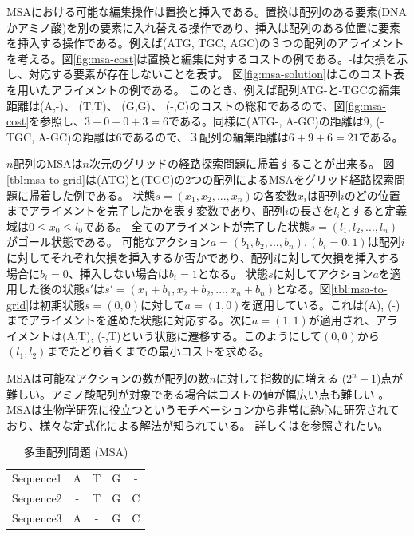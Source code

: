 MSAにおける可能な編集操作は置換と挿入である。置換は配列のある要素(DNAかアミノ酸)を別の要素に入れ替える操作であり、挿入は配列のある位置に要素を挿入する操作である。例えば(ATG, TGC, AGC)の３つの配列のアライメントを考える。図\ref{fig:msa-cost}は置換と編集に対するコストの例である。-は欠損を示し、対応する要素が存在しないことを表す。%
図\ref{fig:msa-solution}はこのコスト表を用いたアライメントの例である。
このとき、例えば配列ATG-と-TGCの編集距離は(A,-)、 (T,T)、 (G,G)、 (-,C)のコストの総和であるので、図\ref{fig:msa-cost}を参照し、$3+0+0+3=6$である。同様に(ATG-, A-GC)の距離は$9$, (-TGC, A-GC)の距離は$6$であるので、３配列の編集距離は$6+9+6=21$である。

$n$配列のMSAは$n$次元のグリッドの経路探索問題に帰着することが出来る\cite{korf:2000}。
図\ref{tbl:msa-to-grid}は(ATG)と(TGC)の2つの配列によるMSAをグリッド経路探索問題に帰着した例である。
状態$s = (x_1, x_2,...,x_n)$の各変数$x_i$は配列$i$のどの位置までアライメントを完了したかを表す変数であり、配列$i$の長さを$l_i$とすると定義域は$0 \leq x_0 \leq l_0$である。
全てのアライメントが完了した状態$s=(l_1, l_2,...,l_n)$がゴール状態である。
可能なアクション$a=(b_1, b_2, ..., b_n), (b_i=0, 1)$は配列$i$に対してそれぞれ欠損を挿入するか否かであり、配列$i$に対して欠損を挿入する場合に$b_i=0$、挿入しない場合は$b_i=1$となる。
状態$s$に対してアクション$a$を適用した後の状態$s'$は$s'=(x_1+b_1, x_2+b_2,..., x_n+b_n)$となる。図\ref{tbl:msa-to-grid}は初期状態$s=(0,0)$に対して$a=(1,0)$を適用している。これは(A), (-)までアライメントを進めた状態に対応する。次に$a=(1,1)$が適用され、アライメントは(A,T), (-,T)という状態に遷移する。このようにして$(0, 0)$から$(l_1, l_2)$までたどり着くまでの最小コストを求める。

MSAは可能なアクションの数が配列の数$n$に対して指数的に増える ($2^n-1$)点が難しい。アミノ酸配列が対象である場合はコストの値が幅広い点も難しい \cite{pearson1990}。
MSAは生物学研究に役立つというモチベーションから非常に熱心に研究されており、様々な定式化による解法が知られている。
詳しくは\cite{waterman1995introduction,
gusfield1997algorithms,edgar2006multiple}を参照されたい。

\begin{table}
  \centering
  \caption{多重配列問題 (MSA)}
  \begin{tabular}{c|cccc}
    \toprule
	Sequence1 & A & T & G & - \\
	Sequence2 & - & T & G & C \\
	Sequence3 & A & - & G & C \\
        \bottomrule
\end{tabular}
\label{tbl:msa}
\end{table}


